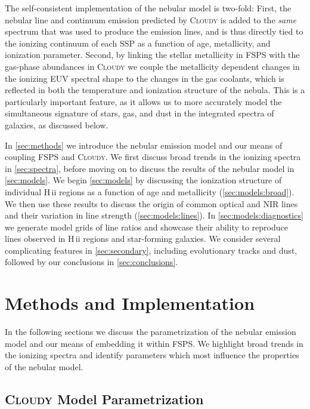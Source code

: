 \documentclass[linenumbers, trackchanges, tighten]{aastex61}%
\newcommand{\Sec}[1]{\autoref{sec:#1}}
\newcommand{\FSPS}{{\sc FSPS}\xspace}
\newcommand{\Cloudy}{\textsc{Cloudy}\xspace}
\newcommand{\hii}{H\,{\sc ii}\xspace}
\begin{document}
The self-consistent implementation of the nebular model is two-fold: First, the nebular line and continuum emission predicted by \Cloudy is added to the \emph{same} spectrum that was used to produce the emission lines, and is thus directly tied to the ionizing continuum of each SSP as a function of age, metallicity, and ionization parameter. Second, by linking the stellar metallicity in \FSPS with the gas-phase abundances in \Cloudy we couple the metallicity dependent changes in the ionizing EUV spectral shape to the changes in the gas coolants, which is reflected in both the temperature and ionization structure of the nebula. This is a particularly important feature, as it allows us to more accurately model the simultaneous signature of stars, gas, and dust in the integrated spectra of galaxies, as discussed below. 

In \Sec{methods} we introduce the nebular emission model and our means of coupling \FSPS and \Cloudy. We first discuss broad trends in the ionizing spectra in \Sec{spectra}, before moving on to discuss the results of the nebular model in \Sec{models}. We begin \Sec{models} by discussing the ionization structure of individual \hii regions as a function of age and metallicity (\Sec{models:broad}). We then use these results to discuss the origin of common optical and NIR lines and their variation in line strength (\Sec{models:lines}). In \Sec{models:diagnostics} we generate model grids of line ratios and showcase their ability to reproduce lines observed in \hii regions and star-forming galaxies. We consider several complicating features in \Sec{secondary}, including evolutionary tracks and dust, followed by our conclusions in \Sec{conclusions}.

\section{Methods and Implementation}\label{sec:methods}

In the following sections we discuss the parametrization of the nebular emission model and our means of embedding it within \FSPS. We highlight broad trends in the ionizing spectra and identify parameters which most influence the properties of the nebular model.

\subsection{\Cloudy Model Parametrization}\label{sec:methods:cloudy}
\end{document}
